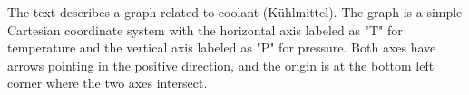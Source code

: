 The text describes a graph related to coolant (Kühlmittel). The graph is a simple Cartesian coordinate system with the horizontal axis labeled as "T" for temperature and the vertical axis labeled as "P" for pressure. Both axes have arrows pointing in the positive direction, and the origin is at the bottom left corner where the two axes intersect.